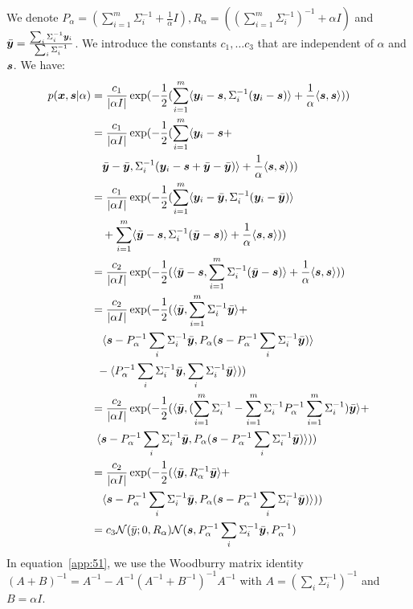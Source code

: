 We denote $P_{\alpha} = (\sum_{i=1}^m \Sigma_i^{-1} + \frac1{\alpha}I), R_{\alpha} =  ((\sum_{i=1}^m \Sigma_i^{-1})^{-1} + \alpha I)$ and $\bar{\boldsymbol{y}} = \frac{\sum_i \Sigma_i^{-1} \boldsymbol{y}_i}{\sum_i \Sigma_i^{-1}}$. We introduce the constants $c_1, \dots c_3$ that are independent of $\alpha$ and $\boldsymbol{s}$.
We have:
\begin{align}
  p(\boldsymbol{x}, \boldsymbol{s} | \alpha) &= \frac{c_1}{|\alpha I|}\exp(-\frac12(\sum_{i=1}^m \langle \boldsymbol{y}_i - \boldsymbol{s}, \Sigma_i^{-1} (\boldsymbol{y}_i - \boldsymbol{s}) \rangle + \frac1{\alpha}\langle \boldsymbol{s} , \boldsymbol{s} \rangle)) \\
  &= \frac{c_1}{|\alpha I|} \exp(-\frac12(\sum_{i=1}^m \langle \boldsymbol{y}_i - \boldsymbol{s} + \nonumber \\& \enspace \enspace \bar{\boldsymbol{y}} - \bar{\boldsymbol{y}}, \Sigma_i^{-1} (\boldsymbol{y}_i - \boldsymbol{s} + \bar{\boldsymbol{y}} - \bar{\boldsymbol{y}}) \rangle + \frac1{\alpha}\langle \boldsymbol{s} , \boldsymbol{s} \rangle)) \\
                        &= \frac{c_1}{|\alpha I|} \exp(-\frac12(\sum_{i=1}^m \langle \boldsymbol{y}_i - \bar{\boldsymbol{y}}, \Sigma_i^{-1} (\boldsymbol{y}_i - \bar{\boldsymbol{y}}) \rangle \nonumber \\& \enspace \enspace+ \sum_{i=1}^m \langle \bar{\boldsymbol{y}} - \boldsymbol{s}, \Sigma_i^{-1} (\bar{\boldsymbol{y}}- \boldsymbol{s}) \rangle + \frac1{\alpha}\langle \boldsymbol{s} , \boldsymbol{s} \rangle)) \\
  &= \frac{c_2}{|\alpha I|} \exp(-\frac12( \langle \bar{\boldsymbol{y}} - \boldsymbol{s}, \sum_{i=1}^m  \Sigma_i^{-1} (\bar{\boldsymbol{y}}- \boldsymbol{s}) \rangle + \frac1{\alpha}\langle \boldsymbol{s} , \boldsymbol{s} \rangle)) \\
                        &= \frac{c_2}{|\alpha I|} \exp(-\frac12( \langle \bar{\boldsymbol{y}}, \sum_{i=1}^m  \Sigma_i^{-1} \bar{\boldsymbol{y}} \rangle + \nonumber \\& \enspace \enspace
  \langle \boldsymbol{s} - P_{\alpha}^{-1} \sum_i \Sigma_i^{-1}\bar{\boldsymbol{y}}, P_{\alpha} (\boldsymbol{s} - P_{\alpha}^{-1} \sum_i \Sigma_i^{-1} \bar{\boldsymbol{y}}) \rangle \nonumber
   \\& \enspace - \langle P_{\alpha}^{-1} \sum_i \Sigma_i^{-1}\bar{\boldsymbol{y}}, \sum_i \Sigma_i^{-1}\bar{\boldsymbol{y}} \rangle)) \\
     &= \frac{c_2}{|\alpha I|} \exp(-\frac12( \langle \bar{\boldsymbol{y}}, (\sum_{i=1}^m  \Sigma_i^{-1} -  \sum_{i=1}^m  \Sigma_i^{-1} P_{\alpha}^{-1} \sum_{i=1}^m  \Sigma_i^{-1}) \bar{\boldsymbol{y}} \rangle + \nonumber \\
  & \enspace \langle \boldsymbol{s} - P_{\alpha}^{-1} \sum_i \Sigma_i^{-1}\bar{\boldsymbol{y}}, P_{\alpha} (\boldsymbol{s} - P_{\alpha}^{-1} \sum_i \Sigma_i^{-1} \bar{\boldsymbol{y}}) \rangle)) \\
                        &= \frac{c_2}{|\alpha I|} \exp(-\frac12( \langle \bar{\boldsymbol{y}}, R_{\alpha}^{-1} \bar{\boldsymbol{y}} \rangle + \nonumber \\& \enspace \enspace \langle \boldsymbol{s} - P_{\alpha}^{-1} \sum_i \Sigma_i^{-1}\bar{\boldsymbol{y}}, P_{\alpha} (\boldsymbol{s} - P_{\alpha}^{-1} \sum_i \Sigma_i^{-1} \bar{\boldsymbol{y}}) \rangle)) \label{app:51}  \\
  &= c_3 \mathcal{N}(\bar{y}; 0, R_{\alpha}) \mathcal{N}(\boldsymbol{s}, P_{\alpha}^{-1} \sum_i \Sigma_i^{-1}\bar{\boldsymbol{y}}, P_{\alpha}^{-1}) \label{app:52}
\end{align}
In equation~\eqref{app:51}, we use the Woodburry matrix identity
$(A + B)^{-1} = A^{-1} - A^{-1} (A^{-1} + B^{-1})^{-1} A^{-1}$ with $A = (\sum_i \Sigma_i^{-1})^{-1}$ and $B = \alpha I$.

